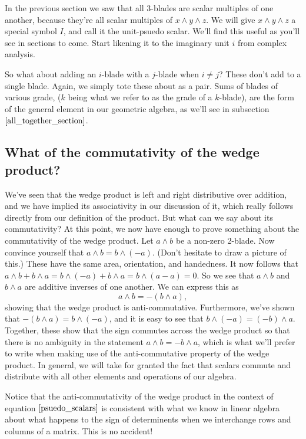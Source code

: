 \documentclass{article}
\begin{document}
In the previous section we saw that all 3-blades are scalar
multiples of one another, because they're all scalar multiples
of $x\wedge y\wedge z$.  We will give $x\wedge y\wedge z$ a
special symbol $I$, and call it the unit-psuedo scalar.
We'll find this useful as you'll see in sections to come.  Start likening
it to the imaginary unit $i$ from complex analysis.

So what about adding an $i$-blade with a $j$-blade when
$i\neq j$?  These don't add to a single blade.  Again,
we simply tote these about as a pair.  Sums of blades
of various grade, ($k$ being what we refer to as the grade of
a $k$-blade), are the form of the general element in our
geometric algebra, as we'll see in subsection $\eqref{all_together_section}$.

\subsection{What of the commutativity of the wedge product?}

We've seen that the wedge product is left and right distributive
over addition, and we have implied its associativity in our discussion
of it, which really follows directly from our definition of the product.
But what can we say about its commutativity?  At this point, we now have
enough to prove something about the commutativity of the wedge product.
Let $a\wedge b$ be a non-zero 2-blade.  Now convince yourself
that $a\wedge b=b\wedge(-a)$.  (Don't hesitate to draw a picture of this.)
These have the same area, orientation,
and handedness.  It now follows that
$a\wedge b+b\wedge a=b\wedge(-a)+b\wedge a=b\wedge(a-a)=0$.
So we see that $a\wedge b$ and $b\wedge a$ are additive inverses
of one another.  We can express this as
\begin{equation*}
a\wedge b = -(b\wedge a),
\end{equation*}
showing that the wedge product is anti-commutative.  Furthermore,
we've shown that $-(b\wedge a)=b\wedge(-a)$, and it is easy to
see that $b\wedge(-a)=(-b)\wedge a$.  Together, these show that
the sign commutes across the wedge product so that there is no ambiguity
in the statement $a\wedge b=-b\wedge a$, which is what we'll prefer
to write when making use of the anti-commutative property of the wedge product.
In general, we will take for granted the
fact that scalars commute and distribute with all other elements
and operations of our algebra.

Notice that the anti-commutativity of the wedge product in the
context of equation $\eqref{psuedo_scalars}$ is consistent with what
we know in linear algebra about what happens to the sign of
determinents when we interchange rows and columns of a matrix.
This is no accident!
\end{document}

